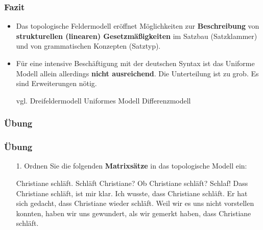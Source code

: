\begin{frame}
\frametitle{Fazit}

\begin{itemize}
	\item Das topologische Feldermodell eröffnet Möglichkeiten zur \textbf{Beschreibung} von \textbf{strukturellen (linearen) Gesetzmäßigkeiten} im Satzbau (\zB Satzklammer) und von grammatischen Konzepten (\zB Satztyp).
	\item[]
	\item Für eine intensive Beschäftigung mit der deutschen Syntax ist das Uniforme Modell allein allerdings \textbf{nicht ausreichend}. Die Unterteilung ist zu grob. Es sind Erweiterungen nötig. 
	
	vgl. Dreifeldermodell \ras Uniformes Modell \ras Differenzmodell
	\\ \hfill \citep[vgl.][]{Woellstein10a}

\end{itemize}

\end{frame}

\subsubsection{Übung}





\begin{frame}
\frametitle{Übung}

\begin{itemize}
	\item[1.] Ordnen Sie die folgenden \textbf{Matrixsätze} in das topologische Modell ein:


\eal
\ex Christiane schläft.
\ex Schläft Christiane?
\ex Ob Christiane schläft?
\ex Schlaf!
\ex Dass Christiane schläft, ist mir klar.
\ex Ich wusste, dass Christiane schläft.
\ex Er hat sich gedacht, dass Christiane wieder schläft.
\ex Weil wir es uns nicht vorstellen konnten, haben wir uns gewundert, als wir gemerkt haben, dass Christiane schläft.
\zl

\end{itemize}

\end{frame}

